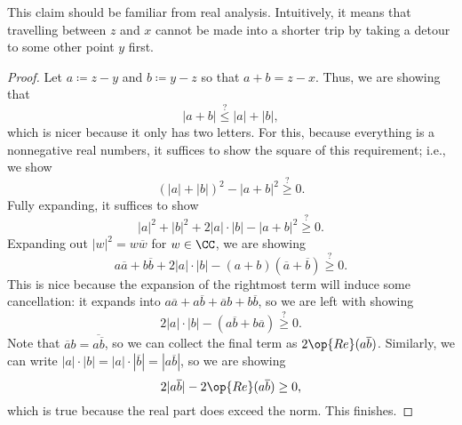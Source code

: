 This claim should be familiar from real analysis. Intuitively, it means that travelling between $z$ and $x$ cannot be made into a shorter trip by taking a detour to some other point $y$ first.
\begin{proof}
	Let $a\coloneqq z-y$ and $b\coloneqq y-z$ so that $a+b=z-x$. Thus, we are showing that
	\[|a+b|\stackrel?\le|a|+|b|,\]
	which is nicer because it only has two letters. For this, because everything is a nonnegative real numbers, it suffices to show the square of this requirement; i.e., we show
	\[(|a|+|b|)^2-|a+b|^2\stackrel?\ge0.\]
	Fully expanding, it suffices to show
	\[|a|^2+|b|^2+2|a|\cdot|b|-|a+b|^2\stackrel?\ge0.\]
	Expanding out $|w|^2=w\overline w$ for $w\in\CC$, we are showing
	\[a\overline a+b\overline b+2|a|\cdot|b|-(a+b)(\overline a+\overline b)\stackrel?\ge0.\]
	This is nice because the expansion of the rightmost term will induce some cancellation: it expands into $a\overline a+a\overline b+\overline ab+b\overline b$, so we are left with showing
	\[2|a|\cdot|b|-(a\overline b+b\overline a)\stackrel?\ge0.\]
	Note that $\overline ab=\overline{a\overline b}$, so we can collect the final term as $2\op{Re}(a\overline b)$. Similarly, we can write $|a|\cdot|b|=|a|\cdot|\overline b|=|a\overline b|$, so we are showing
	\[2|a\overline b|-2\op{Re}(a\overline b)\ge0,\]
	which is true because the real part does exceed the norm. This finishes.
\end{proof}